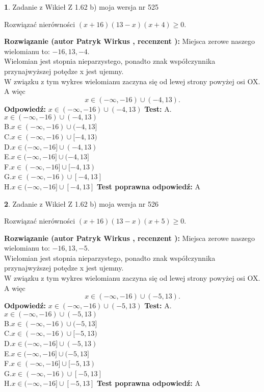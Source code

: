 \documentclass[12pt, a4paper]{article}
\theoremstyle{definition} %
\newtheorem{zad}{}
\newcommand{\zadStart}[1]{\begin{zad}#1\newline}
\newcommand{\zadStop}{\end{zad}}
\newcommand{\rozwStart}[2]{\noindent \textbf{Rozwiązanie (autor #1 , recenzent #2): }\newline}
\newcommand{\rozwStop}{\newline}
\newcommand{\odpStart}{\noindent \textbf{Odpowiedź:}\newline}
\newcommand{\odpStop}{\newline}
\newcommand{\testStart}{\noindent \textbf{Test:}\newline}
\newcommand{\testStop}{\newline}
\newcommand{\kluczStart}{\noindent \textbf{Test poprawna odpowiedź:}\newline}
\newcommand{\kluczStop}{\newline}
\begin{document}
\zadStart{Zadanie z Wikieł Z 1.62 b) moja wersja nr 525}

Rozwiązać nierówności $(x+16)(13-x)(x+4)\ge0$.
\zadStop
\rozwStart{Patryk Wirkus}{}
Miejsca zerowe naszego wielomianu to: $-16, 13, -4$.\\
Wielomian jest stopnia nieparzystego, ponadto znak współczynnika przy\linebreak najwyższej potędze x jest ujemny.\\ W związku z tym wykres wielomianu zaczyna się od lewej strony powyżej osi OX. A więc $$x \in (-\infty,-16) \cup (-4,13).$$
\rozwStop
\odpStart
$x \in (-\infty,-16) \cup (-4,13)$
\odpStop
\testStart
A.$x \in (-\infty,-16) \cup (-4,13)$\\
B.$x \in (-\infty,-16) \cup (-4,13]$\\
C.$x \in (-\infty,-16) \cup [-4,13)$\\
D.$x \in (-\infty,-16] \cup (-4,13)$\\
E.$x \in (-\infty,-16] \cup (-4,13]$\\
F.$x \in (-\infty,-16] \cup [-4,13)$\\
G.$x \in (-\infty,-16) \cup [-4,13]$\\
H.$x \in (-\infty,-16] \cup [-4,13]$
\testStop
\kluczStart
A
\kluczStop



\zadStart{Zadanie z Wikieł Z 1.62 b) moja wersja nr 526}

Rozwiązać nierówności $(x+16)(13-x)(x+5)\ge0$.
\zadStop
\rozwStart{Patryk Wirkus}{}
Miejsca zerowe naszego wielomianu to: $-16, 13, -5$.\\
Wielomian jest stopnia nieparzystego, ponadto znak współczynnika przy\linebreak najwyższej potędze x jest ujemny.\\ W związku z tym wykres wielomianu zaczyna się od lewej strony powyżej osi OX. A więc $$x \in (-\infty,-16) \cup (-5,13).$$
\rozwStop
\odpStart
$x \in (-\infty,-16) \cup (-5,13)$
\odpStop
\testStart
A.$x \in (-\infty,-16) \cup (-5,13)$\\
B.$x \in (-\infty,-16) \cup (-5,13]$\\
C.$x \in (-\infty,-16) \cup [-5,13)$\\
D.$x \in (-\infty,-16] \cup (-5,13)$\\
E.$x \in (-\infty,-16] \cup (-5,13]$\\
F.$x \in (-\infty,-16] \cup [-5,13)$\\
G.$x \in (-\infty,-16) \cup [-5,13]$\\
H.$x \in (-\infty,-16] \cup [-5,13]$
\testStop
\kluczStart
A
\kluczStop
\end{document}
